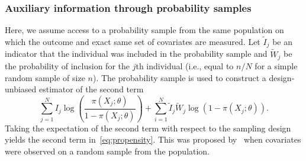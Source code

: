 \documentclass[12pt]{amsart}
\numberwithin{equation}{section}
\theoremstyle{plain}
\begin{document}
\subsubsection{Auxiliary information through probability samples}
\label{subsec:auxprob}

Here, we assume access to a probability sample from the same population on which the outcome and exact same set of covariates are measured.  Let $\tilde I_j$ be an indicator that the individual was included in the probability sample and $\tilde W_j$ be the probability of inclusion for the $j$th individual (i.e., equal to $n/N$ for a simple random sample of size $n$). The probability sample is used to construct a design-unbiased estimator of the second term
\begin{equation}
\label{eq:auxinfoprob}
\sum_{j=1}^N I_j \log \left( \frac{\pi (X_j; \theta)}{1-\pi(X_j; \theta)} \right)  + \sum_{i=1}^N \tilde I_j \tilde W_j \log ( 1 - \pi (X_j; \theta)).
\end{equation}
Taking the expectation of the second term with respect to the sampling design yields the second term in~\eqref{eq:propensity}.  This was proposed by~\cite{Chen2019} when covariates were observed on a random sample from the population.

\end{document}
